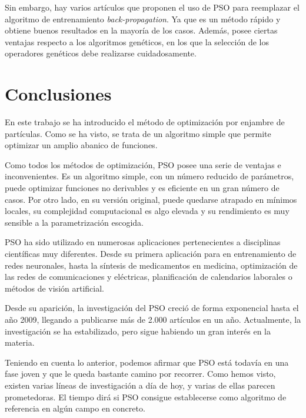 \documentclass[a4paper,12pt,titlepage]{article}
\begin{document}
Sin embargo, hay varios artículos que proponen el uso de PSO para reemplazar el algoritmo de entrenamiento \textit{back-propagation}. Ya que es un método rápido y obtiene buenos resultados en la mayoría de los casos. Además, posee ciertas ventajas respecto a los algoritmos genéticos, en los que la selección de los operadores genéticos debe realizarse cuidadosamente.

\section{Conclusiones}

En este trabajo se ha introducido el método de optimización por enjambre de partículas. Como se ha visto, se trata de un algoritmo simple que permite optimizar un amplio abanico de funciones.

Como todos los métodos de optimización, PSO posee una serie de ventajas e inconvenientes. Es un algoritmo simple, con un número reducido de parámetros, puede optimizar funciones no derivables y es eficiente en un gran número de casos. Por otro lado, en su versión original, puede quedarse atrapado en mínimos locales, su complejidad computacional es algo elevada y su rendimiento es muy sensible a la parametrización escogida.

PSO ha sido utilizado en numerosas aplicaciones pertenecientes a disciplinas científicas muy diferentes. Desde su primera aplicación para en entrenamiento de redes neuronales, hasta la síntesis de medicamentos en medicina, optimización de las redes de comunicaciones y eléctricas, planificación de calendarios laborales o métodos de visión artificial.

Desde su aparición, la investigación del PSO creció de forma exponencial hasta el año 2009, llegando a publicarse más de 2.000 artículos en un año. Actualmente, la investigación se ha estabilizado, pero sigue habiendo un gran interés en la materia.

Teniendo en cuenta lo anterior, podemos afirmar que PSO está todavía en una fase joven y que le queda bastante camino por recorrer. Como hemos visto, existen varias líneas de investigación a día de hoy, y varias de ellas parecen prometedoras. El tiempo dirá si PSO consigue establecerse como algoritmo de referencia en algún campo en concreto.
	

\newpage


\end{document}
